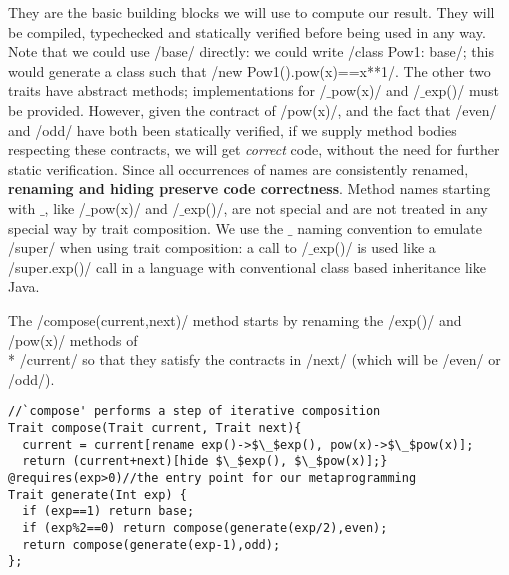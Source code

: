 They are the basic building blocks we will use to compute our result. They will be compiled, typechecked and statically verified before being used in any way.
Note that we could use /base/ directly:
we could write /class Pow1: base/; this would generate a class such that /new Pow1().pow(x)==x**1/.
The other two traits have abstract methods; implementations for /$\_$pow(x)/ and /$\_$exp()/ must be provided. However, given the contract of /pow(x)/,
and the fact that /even/ and /odd/ have both been statically verified,
if we supply method bodies respecting these contracts, we will get \emph{correct} code, without the need for further static verification.
Since all occurrences of names are consistently renamed, \textbf{renaming and hiding preserve code correctness}.
Method names starting with $\_$, like /$\_$pow(x)/ and /$\_$exp()/, are not special and are not treated in any special way by trait composition. We use the $\_$ naming convention to emulate /super/ when using trait composition: a call to /$\_$exp()/ is used like a /super.exp()/ call in a language with conventional class based inheritance like Java.

The /compose(current,next)/ method starts by renaming the /exp()/ and /pow(x)/ methods of\\* /current/
so that they satisfy the contracts in /next/ (which will be 
/even/ or /odd/).
\begin{lstlisting}
//`compose' performs a step of iterative composition
Trait compose(Trait current, Trait next){
  current = current[rename exp()->$\_$exp(), pow(x)->$\_$pow(x)];
  return (current+next)[hide $\_$exp(), $\_$pow(x)];}
@requires(exp>0)//the entry point for our metaprogramming
Trait generate(Int exp) {
  if (exp==1) return base;
  if (exp%2==0) return compose(generate(exp/2),even);
  return compose(generate(exp-1),odd);
};
\end{lstlisting}
